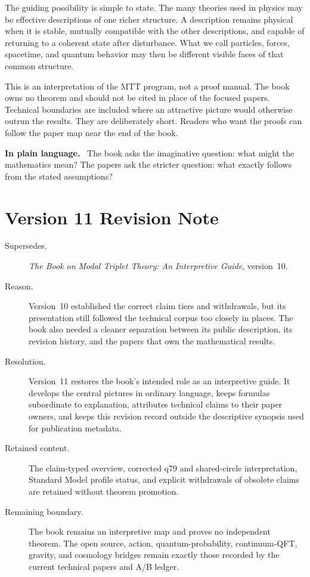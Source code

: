 \documentclass[11pt,openany]{book}
\newenvironment{plainsummary}
  {\par\small\noindent\textbf{In plain language.}\ }
  {\par}
\begin{document}
The guiding possibility is simple to state. The many theories used in physics
may be effective descriptions of one richer structure. A description remains
physical when it is stable, mutually compatible with the other descriptions,
and capable of returning to a coherent state after disturbance. What we call
particles, forces, spacetime, and quantum behavior may then be different
visible faces of that common structure.

This is an interpretation of the MTT program, not a proof manual. The book
owns no theorem and should not be cited in place of the focused papers.
Technical boundaries are included where an attractive picture would
otherwise outrun the results. They are deliberately short. Readers who want
the proofs can follow the paper map near the end of the book.

\begin{plainsummary}
The book asks the imaginative question: what might the mathematics mean?
The papers ask the stricter question: what exactly follows from the stated
assumptions?
\end{plainsummary}

\chapter*{Version 11 Revision Note}

\begin{description}
\item[Supersedes.] \emph{The Book on Modal Triplet Theory: An Interpretive
Guide}, version~10.

\item[Reason.] Version~10 established the correct claim tiers and withdrawals,
but its presentation still followed the technical corpus too closely in
places. The book also needed a cleaner separation between its public
description, its revision history, and the papers that own the mathematical
results.

\item[Resolution.] Version~11 restores the book's intended role as an
interpretive guide. It develops the central pictures in ordinary language,
keeps formulas subordinate to explanation, attributes technical claims to
their paper owners, and keeps this revision record outside the descriptive
synopsis used for publication metadata.

\item[Retained content.] The claim-typed overview, corrected q79 and
shared-circle interpretation, Standard Model profile status, and explicit
withdrawals of obsolete claims are retained without theorem promotion.

\item[Remaining boundary.] The book remains an interpretive map and proves no
independent theorem. The open source, action, quantum-probability,
continuum-QFT, gravity, and cosmology bridges remain exactly those recorded by
the current technical papers and A/B ledger.
\end{description}
\end{document}
